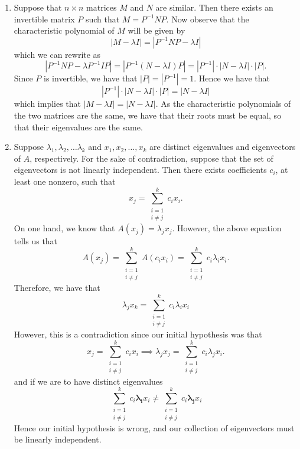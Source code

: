 \documentclass[12pt,letterpaper,boxed]{math_hw_pset}
\newcommand{\<}{\left<}
\renewcommand{\>}{\right>}
\begin{document}
\begin{solution}
    \begin{enumerate}
        \item Suppose that $n\times n$ matrices $M$ and $N$ are similar. 
        Then there exists an invertible matrix $P$ such that $M = P^{-1}NP$. 
        Now observe that the characteristic polynomial of $M$ will be given by 
        \[
            |M - \lambda  I| = |P^{-1}NP - \lambda  I|
        \]
        which we can rewrite as 
        \[
            |P^{-1}NP - \lambda P^{-1}IP| = |P^{-1}(N - \lambda I)P| = |P^{-1}|\cdot|N - \lambda I|\cdot |P|.
        \]
        Since $P$ is invertible, we have that $|P| = |P^{-1}| = 1$. Hence we have  that 
        \[
            |P^{-1}|\cdot|N - \lambda I| \cdot|P| = |N - \lambda I|
        \]
        which implies that $|M - \lambda I| = |N - \lambda I|$. As the characteristic polynomials of the  
        two matrices are the same, we have that their roots must be equal, so that their 
        eigenvalues are the same. 

        \item Suppose $\lambda_1, \lambda_2, \dots \lambda_k$ and $x_1, x_2, \dots, x_k$ are distinct eigenvalues and eigenvectors 
        of $A$, respectively. For the sake of contradiction, suppose that the set of eigenvectors is not linearly 
        independent. Then there exists coefficients $c_i$, at least one nonzero, such that 
        \[
            x_j = \sum_{\substack{i = 1\\ i \ne j}}^kc_ix_i.
        \] 
        On one hand, we know that $A(x_j) = \lambda_jx_j$. However, the above equation tells us that 
        \[
            A(x_j) = \sum_{\substack{i = 1\\ i \ne j}}^kA(c_ix_i) 
            = 
            \sum_{\substack{i = 1\\ i \ne j}}^kc_i\lambda_ix_i.
        \]
        Therefore, we have that 
        \[
            \lambda_jx_k = \sum_{\substack{i = 1\\ i \ne j}}^kc_i\lambda_ix_i
        \]
        However, this is a contradiction since our initial hypothesis was that 
        \[
            x_j = \sum_{\substack{i = 1\\ i \ne j}}^kc_ix_i
            \implies 
            \lambda_jx_j
            = 
            \sum_{\substack{i = 1\\ i \ne j}}^kc_i\lambda_jx_i.
        \]
        and if we are to have distinct eigenvalues
        \[
            \sum_{\substack{i = 1\\ i \ne j}}^kc_i\bm{\lambda_i}x_i  
            \ne 
            \sum_{\substack{i = 1\\ i \ne j}}^kc_i\bm{\lambda_j}x_i
        \]
        Hence our initial hypothesis is wrong, and our collection of eigenvectors must 
        be linearly independent. 
        

\end{enumerate}
\end{solution}
\end{document}
